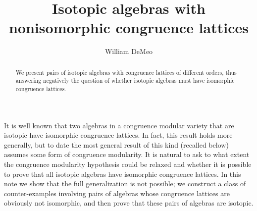 \documentclass{au}
\theoremstyle{plain}
\theoremstyle{definition}
\theoremstyle{remark}
\newcommand{\<}{\ensuremath{\langle}}
\renewcommand{\>}{\ensuremath{\rangle}}
\begin{document}

\title[Isotopic algebras]{Isotopic algebras with nonisomorphic congruence lattices}

\author{William DeMeo}
\address{Department of Mathematics\\
University of South Carolina\\Columbia 29208\\USA}








\begin{abstract}
We present pairs of isotopic algebras with congruence lattices of different
orders, thus answering negatively the question of whether isotopic algebras
must have isomorphic congruence lattices.  
\end{abstract}

\maketitle

It is well known that two algebras in a congruence modular variety that are
isotopic have isomorphic congruence lattices.  In fact, this result holds more
generally, but to date the most general result of this kind (recalled below)
assumes some form of congruence modularity. %
It is natural to ask to what extent the congruence modularity hypothesis could
be relaxed and whether it is possible to prove that all isotopic algebras have
isomorphic congruence lattices.   In this note we show
that the full generalization is not possible; we construct a class of
counter-examples involving pairs of algebras whose
congruence lattices are obviously not isomorphic, and then prove that these
pairs of algebras are isotopic.
\end{document}
